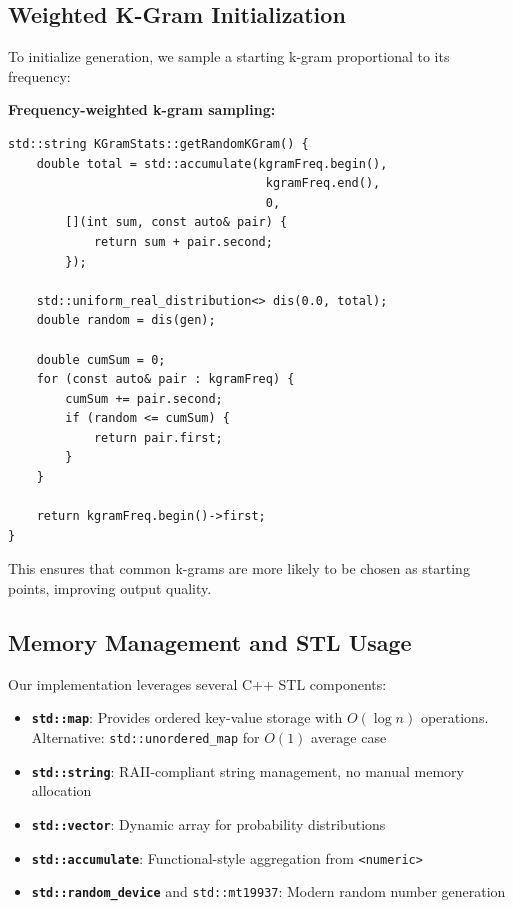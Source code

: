 \documentclass[11pt,letterpaper]{article}
\begin{document}
\subsection{Weighted K-Gram Initialization}

To initialize generation, we sample a starting k-gram proportional to its frequency:

\textbf{Frequency-weighted k-gram sampling:}
\begin{verbatim}
std::string KGramStats::getRandomKGram() {
    double total = std::accumulate(kgramFreq.begin(), 
                                    kgramFreq.end(), 
                                    0,
        [](int sum, const auto& pair) { 
            return sum + pair.second; 
        });
    
    std::uniform_real_distribution<> dis(0.0, total);
    double random = dis(gen);
    
    double cumSum = 0;
    for (const auto& pair : kgramFreq) {
        cumSum += pair.second;
        if (random <= cumSum) {
            return pair.first;
        }
    }
    
    return kgramFreq.begin()->first;
}
\end{verbatim}

This ensures that common k-grams are more likely to be chosen as starting points, improving output quality.

\subsection{Memory Management and STL Usage}

Our implementation leverages several C++ STL components:

\begin{itemize}
    \item \textbf{\texttt{std::map}}: Provides ordered key-value storage with $O(\log n)$ operations. Alternative: \texttt{std::unordered\_map} for $O(1)$ average case
    \item \textbf{\texttt{std::string}}: RAII-compliant string management, no manual memory allocation
    \item \textbf{\texttt{std::vector}}: Dynamic array for probability distributions
    \item \textbf{\texttt{std::accumulate}}: Functional-style aggregation from \texttt{<numeric>}
    \item \textbf{\texttt{std::random\_device}} and \texttt{std::mt19937}: Modern random number generation
\end{itemize}
\end{document}
